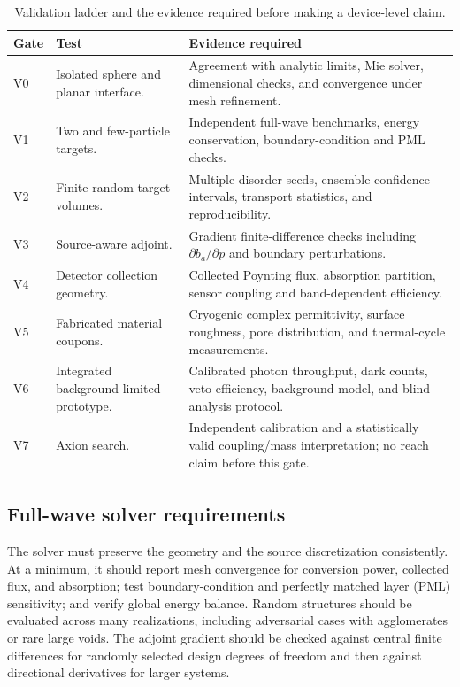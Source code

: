 \documentclass[10.5pt,a4paper]{article}
\begin{document}
\begin{table}[H]\centering\small
\caption{Validation ladder and the evidence required before making a device-level claim.}
\begin{tabularx}{\textwidth}{p{}p{}Y}
\toprule
Gate & Test & Evidence required\\
\midrule
V0 & Isolated sphere and planar interface. & Agreement with analytic limits, Mie solver, dimensional checks, and convergence under mesh refinement.\\
V1 & Two and few-particle targets. & Independent full-wave benchmarks, energy conservation, boundary-condition and PML checks.\\
V2 & Finite random target volumes. & Multiple disorder seeds, ensemble confidence intervals, transport statistics, and reproducibility.\\
V3 & Source-aware adjoint. & Gradient finite-difference checks including $\partial b_a/\partial p$ and boundary perturbations.\\
V4 & Detector collection geometry. & Collected Poynting flux, absorption partition, sensor coupling and band-dependent efficiency.\\
V5 & Fabricated material coupons. & Cryogenic complex permittivity, surface roughness, pore distribution, and thermal-cycle measurements.\\
V6 & Integrated background-limited prototype. & Calibrated photon throughput, dark counts, veto efficiency, background model, and blind-analysis protocol.\\
V7 & Axion search. & Independent calibration and a statistically valid coupling/mass interpretation; no reach claim before this gate.\\
\bottomrule
\end{tabularx}
\end{table}

\subsection{Full-wave solver requirements}
The solver must preserve the geometry and the source discretization consistently. At a minimum, it should report mesh convergence for conversion power, collected flux, and absorption; test boundary-condition and perfectly matched layer (PML) sensitivity; and verify global energy balance. Random structures should be evaluated across many realizations, including adversarial cases with agglomerates or rare large voids. The adjoint gradient should be checked against central finite differences for randomly selected design degrees of freedom and then against directional derivatives for larger systems.
\end{document}
